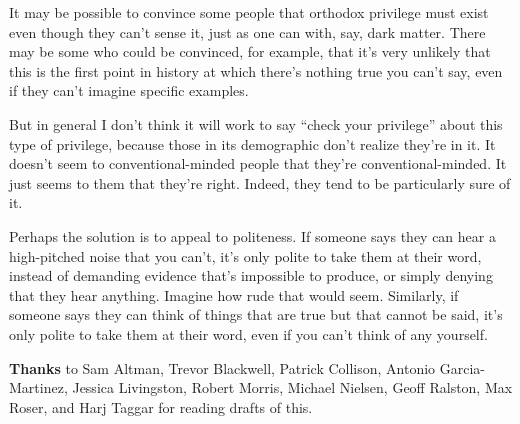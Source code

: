 It may be possible to convince some people that orthodox privilege must
exist even though they can't sense it, just as one can with, say, dark
matter. There may be some who could be convinced, for example, that it's
very unlikely that this is the first point in history at which there's
nothing true you can't say, even if they can't imagine specific
examples.

But in general I don't think it will work to say ``check your
privilege'' about this type of privilege, because those in its
demographic don't realize they're in it. It doesn't seem to
conventional-minded people that they're conventional-minded. It just
seems to them that they're right. Indeed, they tend to be particularly
sure of it.

Perhaps the solution is to appeal to politeness. If someone says they
can hear a high-pitched noise that you can't, it's only polite to take
them at their word, instead of demanding evidence that's impossible to
produce, or simply denying that they hear anything. Imagine how rude
that would seem. Similarly, if someone says they can think of things
that are true but that cannot be said, it's only polite to take them at
their word, even if you can't think of any yourself.

\textbf{Thanks} to Sam Altman, Trevor Blackwell, Patrick Collison,
Antonio Garcia-Martinez, Jessica Livingston, Robert Morris, Michael
Nielsen, Geoff Ralston, Max Roser, and Harj Taggar for reading drafts of
this.
